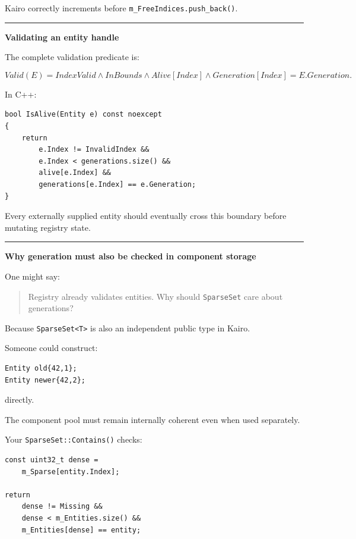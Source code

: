 Kairo correctly increments before \texttt{m\_FreeIndices.push\_back()}.

\begin{center}\rule{0.5\linewidth}{0.5pt}\end{center}

\textbf{Validating an entity handle}

The complete validation predicate is:

\[
Valid(E)=
IndexValid
\land
InBounds
\land
Alive[Index]
\land
Generation[Index]=E.Generation.
\]

In C++:

\begin{verbatim}
bool IsAlive(Entity e) const noexcept
{
    return
        e.Index != InvalidIndex &&
        e.Index < generations.size() &&
        alive[e.Index] &&
        generations[e.Index] == e.Generation;
}
\end{verbatim}

Every externally supplied entity should eventually cross this boundary before mutating registry state.

\begin{center}\rule{0.5\linewidth}{0.5pt}\end{center}

\textbf{Why generation must also be checked in component storage}

One might say:

\begin{quote}
Registry already validates entities. Why should \texttt{SparseSet} care about generations?
\end{quote}

Because \texttt{SparseSet\textless{}T\textgreater{}} is also an independent public type in Kairo.

Someone could construct:

\begin{verbatim}
Entity old{42,1};
Entity newer{42,2};
\end{verbatim}

directly.

The component pool must remain internally coherent even when used separately.

Your \texttt{SparseSet::Contains()} checks:

\begin{verbatim}
const uint32_t dense =
    m_Sparse[entity.Index];

return
    dense != Missing &&
    dense < m_Entities.size() &&
    m_Entities[dense] == entity;
\end{verbatim}

